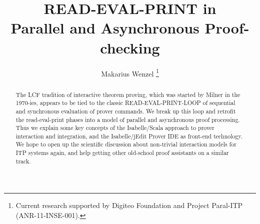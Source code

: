 \documentclass[copyright,creativecommons]{eptcs}
\begin{document}
\title{READ-EVAL-PRINT in \\ Parallel and Asynchronous Proof-checking}
\def\titlerunning{READ-EVAL-PRINT in Parallel and Asynchronous Proof-checking}

\author{Makarius Wenzel \thanks{Current research supported by Digiteo Foundation
  and Project Paral-ITP (ANR-11-INSE-001).} \\
  }
\def\authorrunning{M. Wenzel}
\maketitle

\begin{abstract}
  The LCF tradition of interactive theorem proving, which was started
  by Milner in the 1970-ies, appears to be tied to the classic
  READ-EVAL-PRINT-LOOP of sequential and synchronous evaluation of
  prover commands.  We break up this loop and retrofit the
  read-eval-print phases into a model of parallel and asynchronous
  proof processing.  Thus we explain some key concepts of the
  Isabelle/Scala approach to prover interaction and integration, and
  the Isabelle/jEdit Prover IDE as front-end technology.  We hope to
  open up the scientific discussion about non-trivial interaction
  models for ITP systems again, and help getting other old-school
  proof assistants on a similar track.
\end{abstract}





\end{document}

